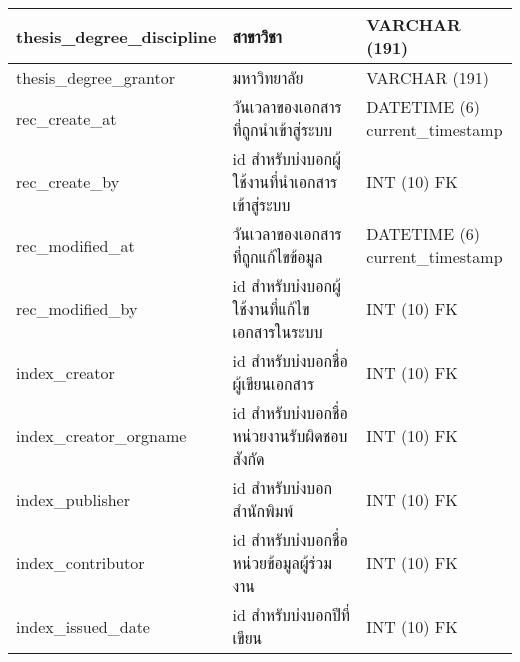 \begin{longtable}[l]{|l|l|l|}
thesis\_degree\_discipline             & สาขาวิชา                                         & VARCHAR   (191)                                                                   \\ \hline
thesis\_degree\_grantor                & มหาวิทยาลัย                                      & VARCHAR   (191)                                                                   \\ \hline
rec\_create\_at                        & วันเวลาของเอกสารที่ถูกนำเข้าสู่ระบบ              & \makecell[l]{DATETIME   (6)\\current\_timestamp} \\ \hline
rec\_create\_by                        & id   สำหรับบ่งบอกผู้ใช้งานที่นำเอกสารเข้าสู่ระบบ & INT   (10) FK                                                                     \\ \hline
rec\_modified\_at                      & วันเวลาของเอกสารที่ถูกแก้ไขข้อมูล                & \makecell[l]{DATETIME   (6)\\current\_timestamp} \\ \hline
rec\_modified\_by                      & id   สำหรับบ่งบอกผู้ใช้งานที่แก้ไขเอกสารในระบบ   & INT   (10) FK                                                                     \\ \hline
index\_creator                         & id สำหรับบ่งบอกชื่อผู้เขียนเอกสาร                & INT   (10) FK                                                                     \\ \hline
index\_creator\_orgname                & id สำหรับบ่งบอกชื่อหน่วยงานรับผิดชอบสังกัด       & INT   (10) FK                                                                     \\ \hline
index\_publisher                       & id สำหรับบ่งบอกสำนักพิมพ์                        & INT   (10) FK                                                                     \\ \hline
index\_contributor                     & id สำหรับบ่งบอกชื่อหน่วยข้อมูลผู้ร่วมงาน         & INT   (10) FK                                                                     \\ \hline
index\_issued\_date                    & id สำหรับบ่งบอกปีที่เขียน                        & INT (10) FK                                                                       \\ \hline
\end{longtable}

